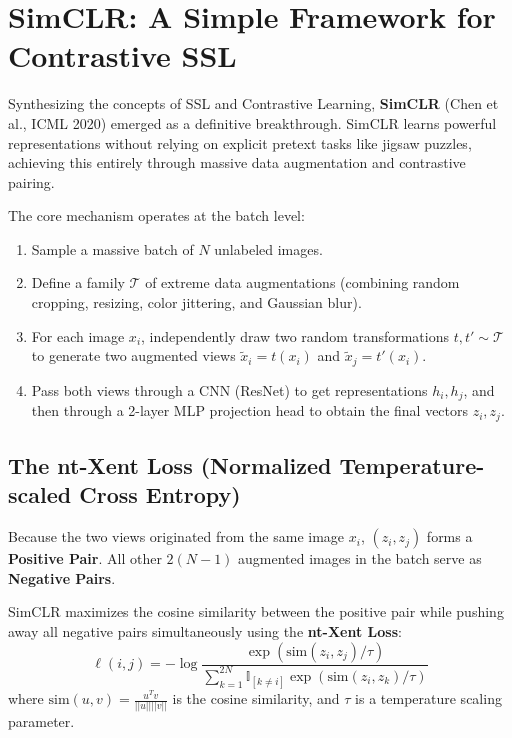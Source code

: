 \section{SimCLR: A Simple Framework for Contrastive SSL}
\label{sec:simclr}

Synthesizing the concepts of SSL and Contrastive Learning, \textbf{SimCLR} (Chen et al., ICML 2020) emerged as a definitive breakthrough. SimCLR learns powerful representations without relying on explicit pretext tasks like jigsaw puzzles, achieving this entirely through massive data augmentation and contrastive pairing.

The core mechanism operates at the batch level:
\begin{enumerate}
    \item Sample a massive batch of $N$ unlabeled images.
    \item Define a family $\mathcal{T}$ of extreme data augmentations (combining random cropping, resizing, color jittering, and Gaussian blur).
    \item For each image $x_i$, independently draw two random transformations $t, t' \sim \mathcal{T}$ to generate two augmented views $\tilde{x}_i = t(x_i)$ and $\tilde{x}_j = t'(x_i)$.
    \item Pass both views through a CNN (ResNet) to get representations $h_i, h_j$, and then through a 2-layer MLP projection head to obtain the final vectors $z_i, z_j$.
\end{enumerate}

\subsection{The nt-Xent Loss (Normalized Temperature-scaled Cross Entropy)}
Because the two views originated from the same image $x_i$, $(z_i, z_j)$ forms a \textbf{Positive Pair}. All other $2(N-1)$ augmented images in the batch serve as \textbf{Negative Pairs}.

SimCLR maximizes the cosine similarity between the positive pair while pushing away all negative pairs simultaneously using the \textbf{nt-Xent Loss}:
\begin{equation}
    \ell(i,j) = -\log \frac{\exp(\text{sim}(z_i, z_j)/\tau)}{\sum_{k=1}^{2N} \mathbb{I}_{[k \neq i]} \exp(\text{sim}(z_i, z_k)/\tau)}
\end{equation}
where $\text{sim}(u, v) = \frac{u^T v}{||u|| ||v||}$ is the cosine similarity, and $\tau$ is a temperature scaling parameter.

